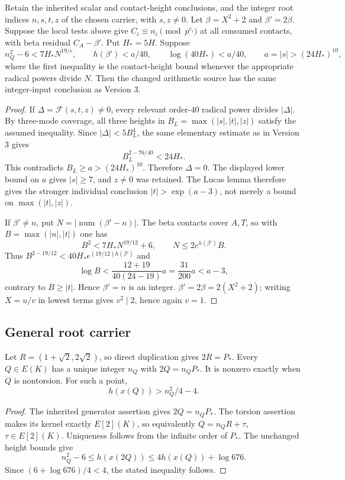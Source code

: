 \begin{theorem}
\label{thm:quartic-selective-arithmetic}
Retain the inherited scalar and contact-height conclusions, and the integer
root indices $n,s,t,z$ of the chosen carrier, with $s,z\ne0$. Let
$\beta=X^2+2$ and $\beta'=2\beta$. Suppose the
local tests above give $C_i\equiv n_i\pmod{p^{e_i}}$ at all consumed
contacts, with beta residual $C_A-\beta'$. Put $H_*=5H$. Suppose
\[
 n_Q^2-6<7H_*N^{19/e},\qquad
 h(\beta')<a/40,\qquad \log(40H_*)<a/40,
 \qquad a=|s|>(24H_*)^{10},
\]
where the first inequality is the contact-height bound whenever the
appropriate radical powers divide $N$. Then the changed arithmetic source
has the same integer-input conclusion as Version 3.
\end{theorem}
\begin{proof}
If $\Delta=\mathcal F(s,t,z)\ne0$, every relevant order-$40$ radical
power divides $|\Delta|$. By three-mode coverage, all three heights in
$B_L=\max(|s|,|t|,|z|)$ satisfy the assumed inequality. Since
$|\Delta|<5B_L^4$, the same elementary estimate as in Version 3 gives
\[
 B_L^{2-76/40}<24H_*.
\]
This contradicts $B_L\ge a>(24H_*)^{10}$. Therefore $\Delta=0$.
The displayed lower bound on $a$ gives $|s|\ge7$, and $z\ne0$ was
retained. The Lucas lemma therefore gives the stronger individual conclusion
$|t|>\exp(a-3)$, not merely a bound on $\max(|t|,|z|)$.

If $\beta'\ne n$, put $N=|\operatorname{num}(\beta'-n)|$.
The beta contacts cover $A,T$, so with $B=\max(|n|,|t|)$ one has
\[
 B^2<7H_*N^{19/12}+6,\qquad
 N\le2e^{h(\beta')}B.
\]
Thus $B^{2-19/12}<40H_*e^{(19/12)h(\beta')}$ and
\[
 \log B<\frac{12+19}{40(24-19)}a=\frac{31}{200}a<a-3,
\]
contrary to $B\ge|t|$. Hence $\beta'=n$ is an integer. $\beta'=2\beta=2(X^2+2)$;
writing $X=u/v$ in lowest terms gives $v^2\mid2$, hence again $v=1$.
\end{proof}


\subsection{General root carrier}
\label{sec:quartic-general-root-variant}

\begin{lemma}
\label{lem:quartic-doubled-indices}
Let $R=(1+\sqrt2,2\sqrt2)$, so direct duplication gives $2R=P_*$.
Every $Q\in E(K)$ has a unique integer $n_Q$ with $2Q=n_QP_*$.
It is nonzero exactly when $Q$ is nontorsion. For such a point,
\[
 h(x(Q))>n_Q^2/4-4.
\]
\end{lemma}
\begin{proof}
The inherited generator assertion gives $2Q=n_QP_*$. The torsion
assertion makes its kernel exactly $E[2](K)$, so equivalently
$Q=n_QR+\tau$, $\tau\in E[2](K)$. Uniqueness follows from the infinite
order of $P_*$. The unchanged height bounds give
\[
 n_Q^2-6\le h(x(2Q))\le4h(x(Q))+\log676.
\]
Since $(6+\log676)/4<4$, the stated inequality follows.
\end{proof}

